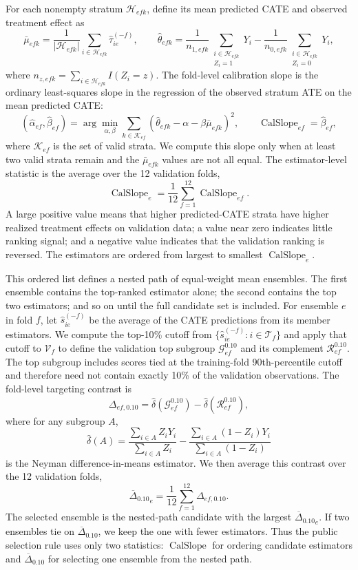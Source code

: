 \documentclass[12pt]{article}
\newcommand{\TargetFrac}{10{\%}\xspace}
\newcommand{\CalSlope}{\ensuremath{\operatorname{CalSlope}}}
\newcommand{\MeanDeltaTopTen}{\ensuremath{\overline{\Delta}_{0.10}}}
\begin{document}
For each nonempty stratum $\mathcal{H}_{efk}$, define its mean predicted CATE and observed treatment effect as
\[
\bar{\mu}_{efk}
= \frac{1}{|\mathcal{H}_{efk}|}
\sum_{i\in\mathcal{H}_{efk}}\widehat{\tau}_{ie}^{(-f)},
\qquad
\widehat{\theta}_{efk}
=
\frac{1}{n_{1,efk}}\sum_{\substack{i\in\mathcal{H}_{efk}\\ Z_i=1}}Y_i
-
\frac{1}{n_{0,efk}}\sum_{\substack{i\in\mathcal{H}_{efk}\\ Z_i=0}}Y_i ,
\]
where $n_{z,efk}=\sum_{i\in\mathcal{H}_{efk}}I(Z_i=z)$. The fold-level calibration slope is the ordinary least-squares slope in the regression of the observed stratum ATE on the mean predicted CATE:
\[
(\widehat{\alpha}_{ef},\widehat{\beta}_{ef})
=
\arg\min_{\alpha,\beta}
\sum_{k\in\mathcal{K}_{ef}}
\left(\widehat{\theta}_{efk}-\alpha-\beta\bar{\mu}_{efk}\right)^2,
\qquad
\CalSlope_{ef}=\widehat{\beta}_{ef},
\]
where $\mathcal{K}_{ef}$ is the set of valid strata. We compute this slope only when at least two valid strata remain and the $\bar{\mu}_{efk}$ values are not all equal. The estimator-level statistic is the average over the 12 validation folds,
\[
\CalSlope_e
=
\frac{1}{12}
\sum_{f=1}^{12}\CalSlope_{ef}.
\]
A large positive value means that higher predicted-CATE strata have higher realized treatment effects on validation data; a value near zero indicates little ranking signal; and a negative value indicates that the validation ranking is reversed. The estimators are ordered from largest to smallest $\CalSlope_e$.

This ordered list defines a nested path of equal-weight mean ensembles. The first ensemble contains the top-ranked estimator alone; the second contains the top two estimators; and so on until the full candidate set is included. For ensemble $e$ in fold $f$, let $\widehat{s}_{ie}^{(-f)}$ be the average of the CATE predictions from its member estimators. We compute the top-\TargetFrac cutoff from $\{\widehat{s}_{ie}^{(-f)}:i\in\mathcal{T}_f\}$ and apply that cutoff to $\mathcal{V}_f$ to define the validation top subgroup $\mathcal{G}_{ef}^{0.10}$ and its complement $\mathcal{R}_{ef}^{0.10}$. The top subgroup includes scores tied at the training-fold 90th-percentile cutoff and therefore need not contain exactly 10{\%} of the validation observations. The fold-level targeting contrast is
\[
\Delta_{ef,0.10}
=
\widehat{\delta}\!\left(\mathcal{G}_{ef}^{0.10}\right)
-
\widehat{\delta}\!\left(\mathcal{R}_{ef}^{0.10}\right),
\]
where for any subgroup $A$,
\[
\widehat{\delta}(A)
=
\frac{\sum_{i\in A}Z_iY_i}{\sum_{i\in A}Z_i}
-
\frac{\sum_{i\in A}(1-Z_i)Y_i}{\sum_{i\in A}(1-Z_i)}
\]
is the Neyman difference-in-means estimator. We then average this contrast over the 12 validation folds,
\[
{\MeanDeltaTopTen}_e
=
\frac{1}{12}
\sum_{f=1}^{12}\Delta_{ef,0.10}.
\]
The selected ensemble is the nested-path candidate with the largest ${\MeanDeltaTopTen}_e$. If two ensembles tie on $\MeanDeltaTopTen$, we keep the one with fewer estimators. Thus the public selection rule uses only two statistics: $\CalSlope$ for ordering candidate estimators and $\MeanDeltaTopTen$ for selecting one ensemble from the nested path.
\end{document}

